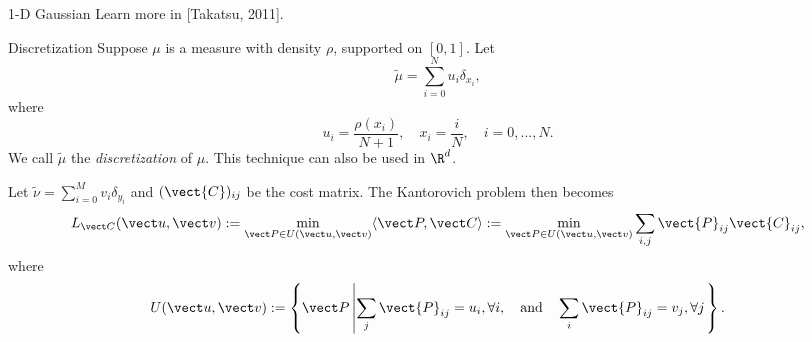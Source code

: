 \begin{frame}{1-D Gaussian}
    \vspace{-1em}
    Learn more in [Takatsu, 2011].
\end{frame}

\begin{frame}{Discretization}
    \footnotesize
    Suppose $\mu$ is a measure with density $\rho$, supported on $[0,1]$.
    Let
    \begin{equation}
        \tilde\mu = \sum_{i=0}^N u_i \delta_{x_i}, 
    \end{equation}
    where
    \begin{equation}
        u_i = \frac{\rho(x_i)}{N+1},\quad x_i=\frac{i}{N},\quad i=0,...,N.
    \end{equation}
    We call $\tilde\mu$ the \textit{discretization} of $\mu$.
    This technique can also be used in $\R^d$.
    
    \pause\vspace{1em}
    Let $\tilde\nu = \sum_{i=0}^M v_i \delta_{y_i}$ 
    and $(\vect{C})_{ij}$ be the cost matrix.
    The Kantorovich problem then becomes
    \begin{equation}
        L_{\vect C}(\vect u,\vect v) := \min_{\vect P\in U(\vect u, \vect v)} \langle \vect P, \vect C \rangle
        := \min_{\vect P\in U(\vect u, \vect v)} \sum_{i,j} \vect{P}_{ij} \vect{C}_{ij},
    \end{equation}
    where
    \begin{equation}
        U(\vect u,\vect v) := \left\{ \vect P \left| 
        \sum_{j} \vect{P}_{ij} = u_i,\forall i,\quad \text{and}\quad
        \sum_{i} \vect{P}_{ij} = v_j,\forall j
        \right.
        \right\}.
    \end{equation}
\end{frame}

